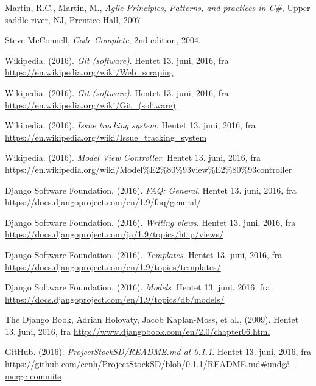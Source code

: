 \documentclass[12pt]{article}
\begin{document}
\newpage
\begin{thebibliography}{9}

	Martin, R.C., Martin, M.,
	\emph{Agile Principles, Patterns, and practices in C\#},
	Upper saddle river, NJ, Prentice Hall,
	2007

	Steve McConnell,
	\emph{Code Complete},
	2nd edition,
	2004.

    Wikipedia. (2016). \textit{Git (software)}. Hentet 13. juni, 2016, fra\\\url{https://en.wikipedia.org/wiki/Web_scraping}

    Wikipedia. (2016). \textit{Git (software)}. Hentet 13. juni, 2016, fra\\\url{https://en.wikipedia.org/wiki/Git_(software)}

    Wikipedia. (2016). \textit{Issue tracking system}. Hentet 13. juni, 2016, fra\\\url{https://en.wikipedia.org/wiki/Issue_tracking_system}

    Wikipedia. (2016). \textit{Model View Controller}. Hentet 13. juni, 2016, fra\\\url{https://en.wikipedia.org/wiki/Model%E2%80%93view%E2%80%93controller}

    Django Software Foundation. (2016). \emph{FAQ: General}. Hentet 13. juni, 2016, fra\\\url{https://docs.djangoproject.com/en/1.9/faq/general/}

    Django Software Foundation. (2016). \textit{\textit{Writing views}}. Hentet 13. juni, 2016, fra\\\url{https://docs.djangoproject.com/ja/1.9/topics/http/views/}

    Django Software Foundation. (2016). \textit{Templates}. Hentet 13. juni, 2016, fra\\\url{https://docs.djangoproject.com/en/1.9/topics/templates/}

    Django Software Foundation. (2016). \textit{Models}. Hentet 13. juni, 2016, fra\\\url{https://docs.djangoproject.com/en/1.9/topics/db/models/}

    The Django Book, Adrian Holovaty, Jacob Kaplan-Moss, et al., (2009). Hentet 13. juni, 2016, fra \url{http://www.djangobook.com/en/2.0/chapter06.html}

    GitHub. (2016). \textit{ProjectStockSD/README.md at 0.1.1}. Hentet 13. juni, 2016, fra\\\url{https://github.com/cenh/ProjectStockSD/blob/0.1.1/README.md#undgå-merge-commits}

\end{thebibliography}
\end{document}
